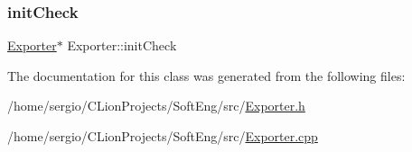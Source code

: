 \subsubsection{\texorpdfstring{init\+Check}{initCheck}}
{\footnotesize\ttfamily \hyperlink{class_exporter}{Exporter}$\ast$ Exporter\+::init\+Check\hspace{0.3cm}{\ttfamily [protected]}}



The documentation for this class was generated from the following files\+:\begin{DoxyCompactItemize}
\item 
/home/sergio/\+C\+Lion\+Projects/\+Soft\+Eng/src/\hyperlink{_exporter_8h}{Exporter.\+h}\item 
/home/sergio/\+C\+Lion\+Projects/\+Soft\+Eng/src/\hyperlink{_exporter_8cpp}{Exporter.\+cpp}\end{DoxyCompactItemize}
